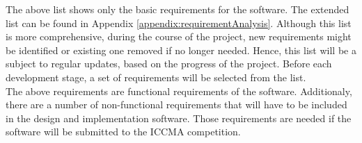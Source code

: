 The above list shows only the basic requirements for the software. The extended list can be found in Appendix \ref{appendix:requirementAnalysis}. Although this list is more comprehensive, during the course of the project, new requirements might be identified or existing one removed if no longer needed. Hence, this list will be a subject to regular updates, based on the progress of the project. Before each development stage, a set of requirements will be selected from the list. \\
\newline
The above requirements are functional requirements of the software. Additionaly, there are a number of non-functional requirements that will have to be included in the design and implementation software. Those requirements are needed if the software will be submitted to the ICCMA competition. 
